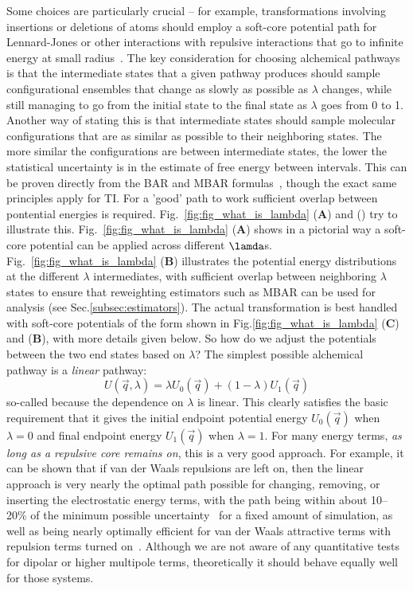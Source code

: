 \documentclass[9pt,bestpractices]{livecoms}
\begin{document}
Some choices are particularly crucial -- for example, transformations involving insertions or deletions of atoms should employ a soft-core potential path for Lennard-Jones or other interactions with repulsive interactions that go to infinite energy at small radius~\cite{beutler1994avoiding, beutler1994molecular,gapsys2012new}.
%
The key consideration for choosing alchemical pathways is that the intermediate states that a given pathway produces should sample configurational ensembles that change as slowly as possible as $\lambda$ changes, while still managing to go from the initial state to the final state as $\lambda$ goes from 0 to 1.
%
Another way of stating this is that intermediate states should sample molecular configurations that are as similar as possible to their neighboring states. The more similar the configurations are between intermediate states, the lower the statistical uncertainty is in the estimate of free energy between intervals. This can be proven directly from the BAR and MBAR formulas~\cite{bennett1976efficient,klimovich2015guidelines}, though the exact same principles apply for TI. For a 'good' path to work sufficient overlap between pontential energies is required. Fig.~\ref{fig:fig_what_is_lambda} (\textbf{A}) and () try to illustrate this. Fig.~\ref{fig:fig_what_is_lambda} (\textbf{A}) shows in a pictorial way a soft-core potential can be applied across different $\lamda$s. Fig.~\ref{fig:fig_what_is_lambda} (\textbf{B}) illustrates the potential energy distributions at the different $\lambda$ intermediates, with sufficient overlap between neighboring $\lambda$ states to ensure that reweighting estimators such as MBAR can be used for analysis (see Sec.\ref{subsec:estimators}). The actual transformation is best handled with soft-core potentials of the form shown in Fig.\ref{fig:fig_what_is_lambda} (\textbf{C}) and (\textbf{B}), with more details given below. 
%
So how do we adjust the potentials between the two end states based on $\lambda$? The simplest possible alchemical pathway is a \textit{linear} pathway:
%
\begin{equation}
U(\vec{q},\lambda) = \lambda U_0(\vec{q}) + (1-\lambda)U_1(\vec{q})   
\end{equation}
%
so-called because the dependence on $\lambda$ is linear. This clearly satisfies the basic requirement that it gives the initial endpoint potential energy $U_0(\vec{q})$ when $\lambda=0$ and final endpoint energy $U_1(\vec{q})$ when $\lambda=1$. 
%
For many energy terms, \textit{as long as a repulsive core remains on}, this is a very good approach. For example, it can be shown that if van der Waals repulsions are left on, then the linear approach is very nearly the optimal path possible for changing, removing, or inserting the electrostatic energy terms, with the path being within about 10--20\% of the minimum possible uncertainty~\cite{naden2015linear} for a fixed amount of simulation, as well as being nearly optimally efficient for van der Waals attractive terms with repulsion terms turned on~\cite{naden2014linear}. Although we are not aware of any quantitative tests for dipolar or higher multipole terms, theoretically it should behave equally well for those systems.
\end{document}
